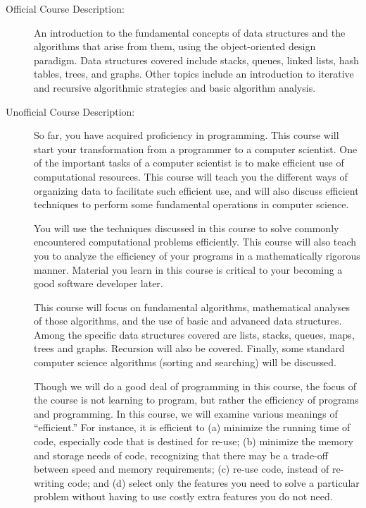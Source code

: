 \documentclass [letterpaper,11pt]{article}
\begin{document}
\begin{description}

\item[Official Course Description:]
An introduction to the fundamental concepts of data structures and the algorithms that arise from them, using the object-oriented design paradigm. Data structures covered include stacks, queues, linked lists, hash tables, trees, and graphs. Other topics include an introduction to iterative and recursive algorithmic strategies and basic algorithm analysis.

\item[Unofficial Course Description:]
So far, you have acquired proficiency in programming. This course will start your transformation from a programmer to a computer scientist. One of the important tasks of a computer scientist is to make efficient use of computational resources. This course will teach you the different ways of organizing data to facilitate such efficient use, and will also discuss efficient techniques to perform some fundamental operations in computer science.

You will use the techniques discussed in this course to solve commonly encountered computational problems efficiently. This course will also teach you to analyze the efficiency of your programs in a mathematically rigorous manner. Material you learn in this course is critical to your becoming a good software developer later.

This course will focus on fundamental algorithms, mathematical analyses of those algorithms, and the use of basic and advanced data structures. Among the specific data structures covered are lists, stacks, queues, maps, trees and graphs. Recursion will also be covered.  Finally, some standard computer science algorithms (sorting and searching) will be discussed.

Though we will do a good deal of programming in this course, the focus of the course is not
learning to program, but rather the efficiency of programs and programming. In this course, we will examine various meanings of ``efficient.''  For instance, it is efficient to (a) minimize the running time of code, especially code that is destined for re-use; (b) minimize the memory and storage needs of code, recognizing that there may be a trade-off between speed and memory requirements; (c) re-use code, instead of re-writing code; and (d) select only the features you need to solve a particular problem without having to use costly extra features you do not need.


\end{description}
\end{document}

